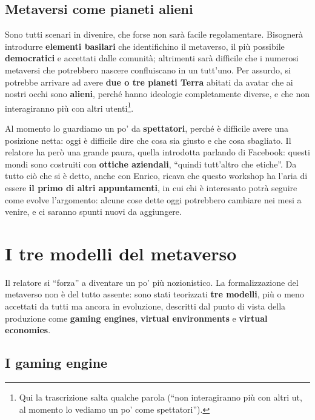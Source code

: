 \subsection{Metaversi come pianeti alieni}

Sono tutti scenari in divenire, che forse non sarà facile regolamentare.
Bisognerà introdurre \textbf{elementi basilari} che identifichino il metaverso,
il più possibile \textbf{democratici} e accettati dalle comunità; altrimenti sarà
difficile che i numerosi metaversi che potrebbero nascere confluiscano in un
tutt'uno. Per assurdo, si potrebbe arrivare ad avere \textbf{due o tre pianeti
Terra} abitati da avatar che ai nostri occhi sono \textbf{alieni}, perché hanno
ideologie completamente diverse, e che non interagiranno più con altri
utenti\footnote{Qui la trascrizione salta qualche parola (``non interagiranno
più con altri ut, al momento lo vediamo un po' come spettatori'').}.

Al momento lo guardiamo un po' da \textbf{spettatori}, perché è difficile avere
una posizione netta: oggi è difficile dire che cosa sia giusto e che cosa
sbagliato. Il relatore ha però una grande paura, quella introdotta parlando di
Facebook: questi mondi sono costruiti con \textbf{ottiche aziendali}, ``quindi
tutt'altro che etiche''. Da tutto ciò che si è detto, anche con Enrico, ricava che
questo workshop ha l'aria di essere \textbf{il primo di altri appuntamenti}, in
cui chi è interessato potrà seguire come evolve l'argomento: alcune cose dette
oggi potrebbero cambiare nei mesi a venire, e ci saranno spunti nuovi da
aggiungere.

\section{I tre modelli del metaverso}
\label{z8:sec:modelli}

Il relatore si ``forza'' a diventare un po' più nozionistico. La formalizzazione
del metaverso non è del tutto assente: sono stati teorizzati \textbf{tre modelli},
più o meno accettati da tutti ma ancora in evoluzione, descritti dal punto di
vista della produzione come \textbf{gaming engines}, \textbf{virtual
environments} e \textbf{virtual economies}.

\subsection{I gaming engine}

